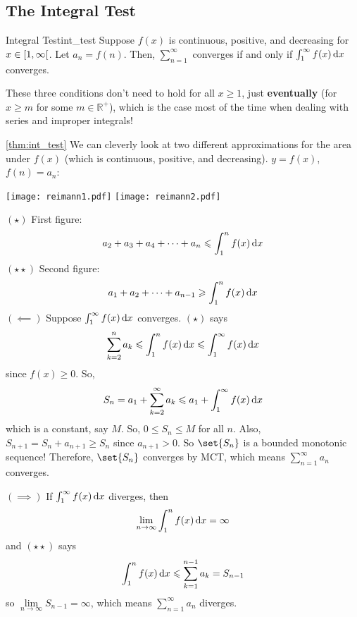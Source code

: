 \subsection*{The Integral Test}
\begin{Theorem}{Integral Test}{int_test}
    Suppose $ f(x) $ is continuous, positive, and decreasing
    for $ x\in\interval[open right]{1}{\infty} $. Let $ a_n=f(n) $. Then,
    $ \sum\limits_{n=1}^{\infty}  $ converges if and only if $ \int_{1}^{\infty} f(x)\odif{x} $
    converges.
\end{Theorem}
\begin{Remark}{}{}
    These three conditions don't need to hold for all $ x\geqslant 1 $, just
    \textbf{eventually} (for $ x\geqslant m $ for some $ m\in\mathbb{R}^+ $),
    which is the case most of the time when dealing with series and improper integrals!
\end{Remark}
\begin{Proof}{\ref{thm:int_test}}{}
    We can cleverly look at two different approximations for the area
    under $ f(x) $ (which is continuous, positive, and decreasing).  $ y=f(x) $,
    $ f(n)=a_n $:
    \begin{center}
        \texttt{[image: reimann1.pdf]}
        \texttt{[image: reimann2.pdf]}
    \end{center}
    $ (\star) $ First figure:
    \[ a_2+a_3+a_4+\cdots+a_n\leqslant \int_{1}^{n} f(x)\odif{x} \]
    $ (\star\star) $ Second figure:
    \[ a_1+a_2+\cdots+a_{n-1}\geqslant \int_{1}^{n} f(x)\odif{x} \]
    $ (\impliedby) $ Suppose $ \int_{1}^{\infty} f(x)\odif{x} $ converges. $ (\star) $
    says
    \[ \sum\limits_{k=2}^{n} a_k\leqslant \int_{1}^{n} f(x)\odif{x}\leqslant
        \int_{1}^{\infty} f(x)\odif{x}  \]
    since $ f(x)\geqslant 0 $. So,
    \[ S_n=a_1+\sum\limits_{k=2}^{\infty} a_k\leqslant a_1+\int_{1}^{\infty} f(x)\odif{x}  \]
    which is a constant, say $ M $. So, $ 0\leqslant S_n\leqslant M $ for all $ n $.
    Also, $ S_{n+1}=S_{n}+a_{n+1}\geqslant S_n $ since $ a_{n+1}>0 $. So
    $ \set{S_n} $ is a bounded monotonic sequence! Therefore,
    $ \set{S_n} $ converges by MCT, which means $ \sum\limits_{n=1}^{\infty} a_n $
    converges.

    $ (\implies) $ If $ \int_{1}^{\infty} f(x)\odif{x}  $ diverges, then
    \[ \lim\limits_{{n} \to {\infty}} \int_{1}^{n} f(x)\odif{x} =\infty \]
    and $ (\star\star) $ says
    \[ \int_{1}^{n} f(x)\odif{x}\leqslant \sum\limits_{k=1}^{n-1} a_k=S_{n-1} \]
    so $ \lim\limits_{{n} \to {\infty}} S_{n-1}=\infty $, which means
    $ \sum\limits_{n=1}^{\infty} a_n $ diverges.
\end{Proof}

